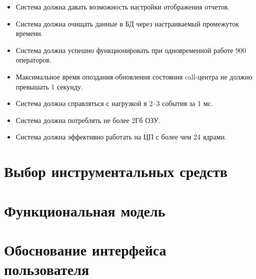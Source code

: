 \begin{itemize}
    \item Система должна давать возможность настройки отображения отчетов.
    \item Система должна очищать данные в БД через настраиваемый промежуток времени.
    \item Система должна успешно функционировать при одновременной работе 900 операторов.
    \item Максимальное время опоздания обновления состояния call-центра не должно превышать 1 секунду.
    \item Система должна справляться с нагрузкой в 2--3 события за 1 мс.
    \item Система должна потреблять не более 2Гб ОЗУ.
    \item Система должна эффективно работать на ЦП с более чем 24 ядрами.
\end{itemize}

\section{Выбор инструментальных средств}

\section{Функциональная модель}

\section{Обоснование интерфейса пользователя}